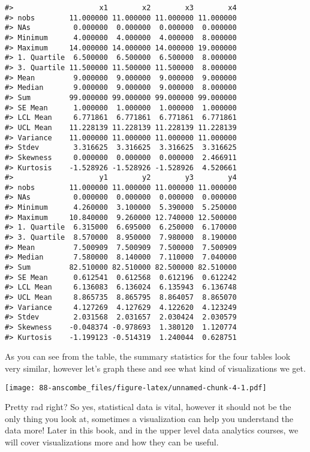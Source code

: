 \documentclass[
]{book}
\begin{document}
\begin{verbatim}
#>                    x1        x2        x3        x4
#> nobs        11.000000 11.000000 11.000000 11.000000
#> NAs          0.000000  0.000000  0.000000  0.000000
#> Minimum      4.000000  4.000000  4.000000  8.000000
#> Maximum     14.000000 14.000000 14.000000 19.000000
#> 1. Quartile  6.500000  6.500000  6.500000  8.000000
#> 3. Quartile 11.500000 11.500000 11.500000  8.000000
#> Mean         9.000000  9.000000  9.000000  9.000000
#> Median       9.000000  9.000000  9.000000  8.000000
#> Sum         99.000000 99.000000 99.000000 99.000000
#> SE Mean      1.000000  1.000000  1.000000  1.000000
#> LCL Mean     6.771861  6.771861  6.771861  6.771861
#> UCL Mean    11.228139 11.228139 11.228139 11.228139
#> Variance    11.000000 11.000000 11.000000 11.000000
#> Stdev        3.316625  3.316625  3.316625  3.316625
#> Skewness     0.000000  0.000000  0.000000  2.466911
#> Kurtosis    -1.528926 -1.528926 -1.528926  4.520661
#>                    y1        y2        y3        y4
#> nobs        11.000000 11.000000 11.000000 11.000000
#> NAs          0.000000  0.000000  0.000000  0.000000
#> Minimum      4.260000  3.100000  5.390000  5.250000
#> Maximum     10.840000  9.260000 12.740000 12.500000
#> 1. Quartile  6.315000  6.695000  6.250000  6.170000
#> 3. Quartile  8.570000  8.950000  7.980000  8.190000
#> Mean         7.500909  7.500909  7.500000  7.500909
#> Median       7.580000  8.140000  7.110000  7.040000
#> Sum         82.510000 82.510000 82.500000 82.510000
#> SE Mean      0.612541  0.612568  0.612196  0.612242
#> LCL Mean     6.136083  6.136024  6.135943  6.136748
#> UCL Mean     8.865735  8.865795  8.864057  8.865070
#> Variance     4.127269  4.127629  4.122620  4.123249
#> Stdev        2.031568  2.031657  2.030424  2.030579
#> Skewness    -0.048374 -0.978693  1.380120  1.120774
#> Kurtosis    -1.199123 -0.514319  1.240044  0.628751
\end{verbatim}

As you can see from the table, the summary statistics for the four tables look very similar, however let's graph these and see what kind of visualizations we get.

\texttt{[image: 88-anscombe\_files/figure-latex/unnamed-chunk-4-1.pdf]}

Pretty rad right? So yes, statistical data is vital, however it should not be the only thing you look at, sometimes a visualization can help you understand the data more! Later in this book, and in the upper level data analytics courses, we will cover visualizations more and how they can be useful.

  
\end{document}
